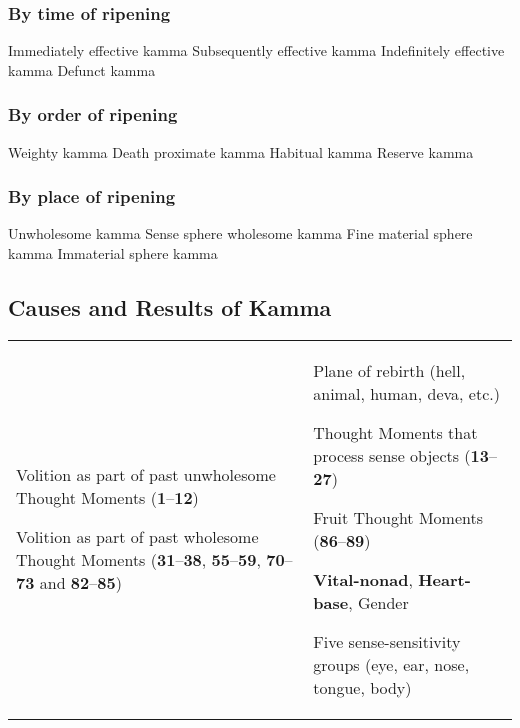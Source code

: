 \documentclass[a4 paper, 12pt]{article}
\begin{document}
\subsubsection*{By time of ripening}

 Immediately effective kamma  Subsequently effective kamma  Indefinitely effective kamma  Defunct kamma

\subsubsection*{By order of ripening}

 Weighty kamma  Death proximate kamma  Habitual kamma  Reserve kamma

\subsubsection*{By place of ripening}

 Unwholesome kamma  Sense sphere wholesome kamma  Fine material sphere kamma  Immaterial sphere kamma

\subsection*{Causes and Results of Kamma}

\begin{tabular*}{\textwidth}{L{\tabcolsep} | L{\tabcolsep}}
\toprule
{} &  \\
\midrule

Volition as part of past unwholesome Thought Moments (\textbf{1}--\textbf{12})

\vspace{2mm}

Volition as part of past wholesome Thought Moments (\textbf{31}--\textbf{38}, \textbf{55}--\textbf{59}, \textbf{70}--\textbf{73} and \textbf{82}--\textbf{85})
&
Plane of rebirth (hell, animal, human, deva, etc.)

\vspace{2mm}

Thought Moments that process sense objects (\textbf{13}--\textbf{27})

\vspace{2mm}

Fruit Thought Moments (\textbf{86}--\textbf{89})

\vspace{2mm}

\textbf{Vital-nonad}, \textbf{Heart-base}, Gender
\vspace{2mm}

Five sense-sensitivity groups (eye, ear, nose, tongue, body)
  \\
  
\bottomrule
\end{tabular*}
\end{document}
